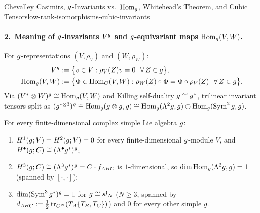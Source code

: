 \begin{zkmodule}{Chevalley Casimirs, $g$-Invariants vs.\ $\operatorname{Hom}_{g}$, Whitehead's Theorem, and Cubic Tensors}{low-rank-isomorphisms-cubic-invariants}
\paragraph{2.\ Meaning of $g$-invariants $V^{g}$ and $g$-equivariant maps $\operatorname{Hom}_{g}(V,W)$.}
For $g$-representations $(V,\rho_V)$ and $(W,\rho_W)$:
\begin{equation}
\label{eq:Vg-and-Homg-def}
\begin{aligned}
V^{\fg} &:= \bigl\{v \in V : \rho_V(Z)v = 0\ \ \forall\,Z\in\fg\bigr\},\\
\Hom_{\fg}(V,W) &:= \bigl\{\Phi \in \Hom_{\C}(V,W) : \rho_W(Z)\circ\Phi = \Phi\circ\rho_V(Z)\ \ \forall\,Z\in\fg\bigr\}.
\end{aligned}
\end{equation}
Via $(V^*\otimes W)^{g} \cong \operatorname{Hom}_{g}(V,W)$ and Killing self-duality $g \cong g^*$, trilinear invariant tensors split as $(g^{*\otimes 3})^{g} \cong \operatorname{Hom}_{g}(g\otimes g, g) \cong \operatorname{Hom}_{g}(\Lambda^2g, g) \oplus \operatorname{Hom}_{g}(\operatorname{Sym}^2g, g)$.
\end{zkmodule}

\begin{proposition}
\label{prop:whitehead-cubic-proof}
For every finite-dimensional complex simple Lie algebra $g$:
\begin{enumerate}[label=(\alph*),leftmargin=*]
  \item $H^1(g;V) = H^2(g;V) = 0$ for every finite-dimensional $g$-module $V$, and $H^\bullet(g;C) \cong (\Lambda^\bullet g^*)^{g}$;
  \item $H^3(g;C) \cong (\Lambda^3g^*)^{g} = C\cdot f_{ABC}$ is $1$-dimensional, so $\dim\operatorname{Hom}_{g}(\Lambda^2g,g) = 1$ (spanned by $[\cdot,\cdot]$);
  \item $\dim(\operatorname{Sym}^3g^*)^{g} = 1$ for $g \cong sl_N$ ($N \ge 3$, spanned by $d_{ABC} := \frac{1}{2}\operatorname{tr}_{C^N}(T_A\{T_B,T_C\})$) and $0$ for every other simple $g$.
\end{enumerate}
\end{proposition}

